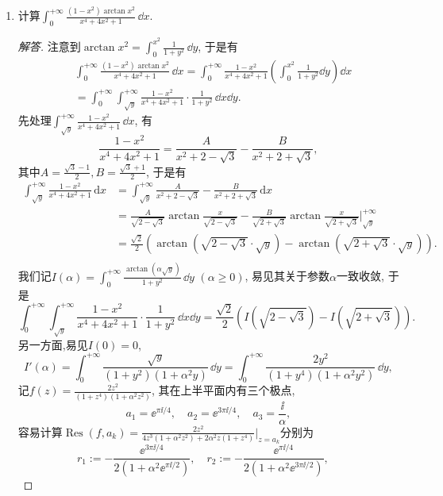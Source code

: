 \begin{b}
\begin{enumerate}
\begin{proof}[解答(原作者)]
故\(\int_{n\pi}^{(n+1)\pi}\frac{x}{1+x^\alpha\sin^2x}\,\dd x=O(n^{1-\alpha/2})\).
\end{proof}
\item 计算\(\int_{0}^{+\infty}\frac{(1-x^2)\arctan x^2}{x^4+4x^2+1}\,\dd x.\)
\begin{proof}[解答]
注意到\(\arctan x^2=\int_{0}^{x^2}\frac{1}{1+y^2}\,\dd y\), 于是有
\[\begin{split}
&\int_{0}^{+\infty}\frac{(1-x^2)\arctan x^2}{x^4+4x^2+1}\,\dd x
=\int_{0}^{+\infty}\frac{1-x^2}{x^4+4x^2+1}\left(\int_{0}^{x^2}\frac{1}{1+y^2}\dd y\right)\dd x\\
&=\int_{0}^{+\infty}\int_{\sqrt{y}}^{+\infty}\frac{1-x^2}{x^4+4x^2+1}\cdot\frac{1}{1+y^2}\,\dd x\dd y.
\end{split}\]
先处理\(\int_{\sqrt{y}}^{+\infty}\frac{1-x^2}{x^4+4x^2+1}\,\dd x\), 有
\[\frac{1-x^2}{x^4+4x^2+1}=\frac{A}{x^2+2-\sqrt{3}}-\frac{B}{x^2+2+\sqrt{3}},\]
其中\(A=\frac{\sqrt{3}-1}{2},B=\frac{\sqrt{3}+1}{2}\), 于是有
\[\begin{aligned}
	\int_{\sqrt{y}}^{+\infty}{\frac{1-x^2}{x^4+4x^2+1}}\,\mathrm{d}x
    &=\int_{\sqrt{y}}^{+\infty}{\frac{A}{x^2+2-\sqrt{3}}}-\frac{B}{x^2+2+\sqrt{3}}\,\mathrm{d}x\\
	&=\frac{A}{\sqrt{2-\sqrt{3}}}\arctan \frac{x}{\sqrt{2-\sqrt{3}}}-\frac{B}{\sqrt{2+\sqrt{3}}}\arctan \frac{x}{\sqrt{2+\sqrt{3}}}\bigg|_{\sqrt{y}}^{+\infty}\\
	&=\frac{\sqrt{2}}{2}\left( \arctan \left( \sqrt{2-\sqrt{3}}\cdot \sqrt{y} \right) -\arctan \left( \sqrt{2+\sqrt{3}}\cdot \sqrt{y} \right) \right) .\\
\end{aligned}\]
我们记\(I(\alpha)=\int_{0}^{+\infty}\frac{\arctan\left(\alpha\sqrt{y}\right)}{1+y^2}\,\dd y\) \((\alpha\geqslant 0)\), 易见其关于参数\(\alpha\)一致收敛,  于是
\[\int_{0}^{+\infty}\int_{\sqrt{y}}^{+\infty}\frac{1-x^2}{x^4+4x^2+1}\cdot\frac{1}{1+y^2}\,\dd x\dd y
=\frac{\sqrt{2}}{2}\left(I\left(\sqrt{2-\sqrt{3}}\right)-I\left(\sqrt{2+\sqrt{3}}\right)\right).\]
另一方面,易见\(I(0)=0\),
\[I'(\alpha)=\int_{0}^{+\infty}\frac{\sqrt{y}}{(1+y^2)(1+\alpha^2y)}\,\dd y
=\int_{0}^{+\infty}\frac{2y^2}{(1+y^4)(1+\alpha^2y^2)}\,\dd y,\]
记\(f(z)=\frac{2z^2}{(1+z^4)(1+\alpha^2z^2)}\), 其在上半平面内有三个极点,
\[a_1=\ee^{\pi\ii/4},\quad a_2=\ee^{3\pi\ii/4},\quad a_3=\frac{\ii}{\alpha},\]
容易计算\(\operatorname{Res}(f,a_k)=\frac{2z^2}{4z^3(1+\alpha^2z^2)+2\alpha^2z(1+z^4)}\Big|_{z=a_k}\)分别为
\[r_1:=-\frac{\ee^{3\pi\ii/4}}{2\left(1+\alpha^2\ee^{\pi\ii/2}\right)},\quad 
r_2:=-\frac{\ee^{\pi\ii/4}}{2\left(1+\alpha^2\ee^{3\pi\ii/2}\right)},\quad 
\]
\end{proof}
\end{enumerate}
\end{b}
